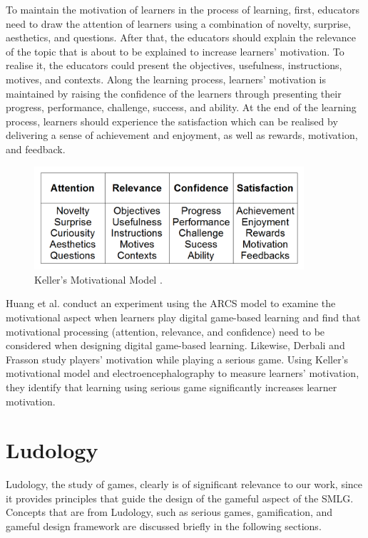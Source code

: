 \documentclass[12pt, a4paper]{report}
\begin{document}
To maintain the motivation of learners in the process of learning, first, educators need to draw the attention of learners using a combination of novelty, surprise, aesthetics, and questions. After that, the educators should explain the relevance of the topic that is about to be explained to increase learners' motivation. To realise it, the educators could present the objectives, usefulness, instructions, motives, and contexts. Along the learning process, learners' motivation is maintained by raising the confidence of the learners through presenting their progress, performance, challenge, success, and ability. At the end of the learning process, learners should experience the satisfaction which can be realised by delivering a sense of achievement and enjoyment, as well as rewards, motivation, and feedback.

\begin{figure}[ht]
\centering
\includegraphics[width=10cm]{keller}
\caption{Keller's Motivational Model \cite{keller2010motivational}.}
\label{keller}
\end{figure}

Huang et al. \cite{huang2010sustaining} conduct an experiment using the ARCS model to examine the motivational aspect when learners play digital game-based learning and find that motivational processing (attention, relevance, and confidence) need to be considered when designing digital game-based learning. Likewise, Derbali and Frasson \cite{derbali2010players} study players' motivation while playing a serious game. Using Keller's motivational model and electroencephalography to measure learners' motivation, they identify that learning using serious game significantly increases learner motivation. 

\section{Ludology}
Ludology, the study of games, clearly is of significant relevance to our work, since it provides principles that guide the design of the gameful aspect of the SMLG. Concepts that are from Ludology, such as serious games, gamification, and gameful design framework \cite{deterding2015lens} are discussed briefly in the following sections.   
\end{document}
